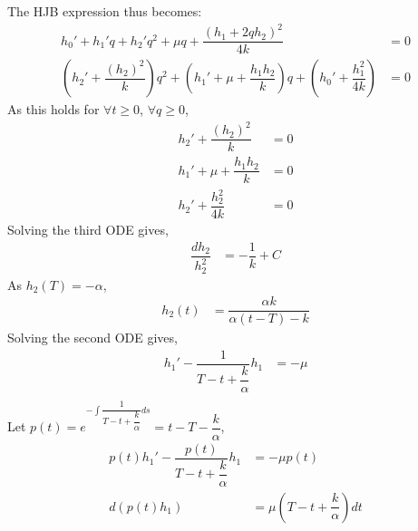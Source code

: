 \documentclass{article}
\begin{document}
The HJB expression thus becomes:\\
\begin{equation*}
    \begin{split}
      h_{0}'+h_{1}'q+h_{2}'q^2+\mu q + \dfrac{(h_{1} + 2qh_{2})^{2}}{4k}&=0\\
      (h_{2}' +\dfrac{(h_{2})^{2}}{k})q^{2} + (h_{1}' + \mu + \dfrac{h_{1}h_{2}}{k})q + (h_{0}' +\dfrac{h_{1}^{2}}{4k}) &=0
    \end{split}
\end{equation*}
As this holds for $\forall t \geq 0$, $\forall q \geq 0$, 
\begin{equation*}
    \begin{split}
      h_{2}' +\dfrac{(h_{2})^{2}}{k}&=0\\
      h_{1}' + \mu + \dfrac{h_{1}h_{2}}{k}&=0\\
      h_{2}' +\dfrac{h_{2}^{2}}{4k} &=0
    \end{split}
\end{equation*}
Solving the third ODE gives,\\
\begin{equation*}
    \begin{split}
      \dfrac{dh_{2}}{h_{2}^{2}} &= -\dfrac{1}{k} +C
    \end{split}
\end{equation*}
As $h_{2}(T) = -\alpha$,
\begin{equation}
    \begin{split}
     h_{2}(t)&= \dfrac{\alpha k}{\alpha (t-T) - k} \label{eq:4}
    \end{split}
\end{equation}
Solving the second ODE gives,\\
\begin{equation*}
    \begin{split}
     h_{1}' - \dfrac{1}{T - t + \dfrac{k}{\alpha}}h_{1} &= -\mu\\
    \end{split}
\end{equation*}
Let $p(t) = e^{-\int\dfrac{1}{T-t+\dfrac{k}{\alpha}}ds} = t-T-\dfrac{k}{\alpha}$,
\begin{equation*}
    \begin{split}
     p(t)h_{1}' - \dfrac{p(t)}{T - t + \dfrac{k}{\alpha}}h_{1} &= -\mu p(t)\\
     d(p(t)h_{1}) &= \mu(T-t+\dfrac{k}{\alpha})dt\\
    \end{split}
\end{equation*}
\end{document}
